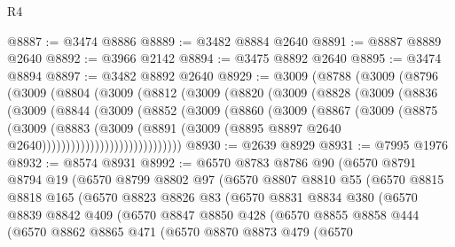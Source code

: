 \begin{lexlean}{R4}
\begin{coremodule}
@8887 := @3474 @8886
@8889 := @3482 @8884 @2640
@8891 := @8887 @8889 @2640
@8892 := @3966 @2142
@8894 := @3475 @8892 @2640
@8895 := @3474 @8894
@8897 := @3482 @8892 @2640
@8929 := @3009
    (@8788
      (@3009
        (@8796
          (@3009
            (@8804
              (@3009
                (@8812
                  (@3009
                    (@8820
                      (@3009
                        (@8828
                          (@3009
                            (@8836
                              (@3009
                                (@8844
                                  (@3009
                                    (@8852
                                      (@3009
                                        (@8860
                                          (@3009
                                            (@8867
                                              (@3009
                                                (@8875
                                                  (@3009
                                                    (@8883
                                                      (@3009
                                                        (@8891
                                                          (@3009
                                                            (@8895
                                                              @8897
                                                              @2640
                                                              @2640)))))))))))))))))))))))))))))
@8930 := @2639 @8929
@8931 := @7995 @1976
@8932 := @8574 @8931
@8992 := @6570
    @8783
    @8786
    @90
    (@6570
      @8791
      @8794
      @19
      (@6570
        @8799
        @8802
        @97
        (@6570
          @8807
          @8810
          @55
          (@6570
            @8815
            @8818
            @165
            (@6570
              @8823
              @8826
              @83
              (@6570
                @8831
                @8834
                @380
                (@6570
                  @8839
                  @8842
                  @409
                  (@6570
                    @8847
                    @8850
                    @428
                    (@6570
                      @8855
                      @8858
                      @444
                      (@6570
                        @8862
                        @8865
                        @471
                        (@6570
                          @8870
                          @8873
                          @479
                          (@6570

\end{coremodule}
\end{lexlean}
